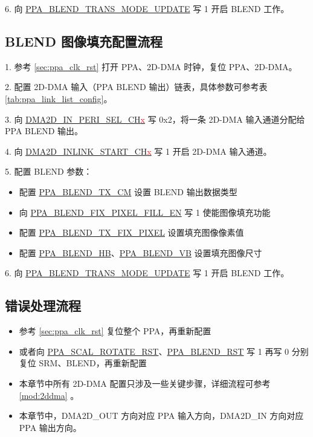 \documentclass[main\_\_CN.tex]{subfiles}
\begin{document}
6. 向 \hyperref[fielddesc:PPABLENDTRANSMODEUPDATE]{PPA\_BLEND\_TRANS\_MODE\_UPDATE} 写 1 开启 BLEND 工作。

\subsection{BLEND 图像填充配置流程}
1. 参考 \ref{sec:ppa_clk_rst} 打开 PPA、2D-DMA 时钟，复位 PPA、2D-DMA。

2. 配置 2D-DMA 输入（PPA BLEND 输出）链表，具体参数可参考表 \ref{tab:ppa_link_list_config}。

3. 向 \hyperref[fielddesc:DMA2DINPERISELCHN]{DMA2D\_IN\_PERI\_SEL\_CH\textcolor{red}{x}} 写 0x2，将一条 2D-DMA 输入通道分配给 PPA BLEND 输出。

4. 向 \hyperref[fielddesc:DMA2DINLINKSTARTCHN]{DMA2D\_INLINK\_START\_CH\textcolor{red}{x}} 写 1 开启 2D-DMA 输入通道。

5. 配置 BLEND 参数：
\begin{itemize}
    \item 配置 \hyperref[fielddesc:PPABLENDTXCM]{PPA\_BLEND\_TX\_CM} 设置 BLEND 输出数据类型
    \item 向 \hyperref[fielddesc:PPABLENDFIXPIXELFILLEN]{PPA\_BLEND\_FIX\_PIXEL\_FILL\_EN} 写 1 使能图像填充功能
    \item 配置 \hyperref[fielddesc:PPABLENDTXFIXPIXEL]{PPA\_BLEND\_TX\_FIX\_PIXEL} 设置填充图像像素值
    \item 配置 \hyperref[fielddesc:PPABLENDHB]{PPA\_BLEND\_HB}、\hyperref[fielddesc:PPABLENDVB]{PPA\_BLEND\_VB} 设置填充图像尺寸
\end{itemize}

6. 向 \hyperref[fielddesc:PPABLENDTRANSMODEUPDATE]{PPA\_BLEND\_TRANS\_MODE\_UPDATE} 写 1 开启 BLEND 工作。

\subsection{错误处理流程}
\begin{itemize}
    \item 参考 \ref{sec:ppa_clk_rst} 复位整个 PPA，再重新配置
    \item 或者向 \hyperref[fielddesc:PPASCALROTATERST]{PPA\_SCAL\_ROTATE\_RST}、\hyperref[fielddesc:PPABLENDRST]{PPA\_BLEND\_RST} 写 1 再写 0 分别复位 SRM、BLEND，再重新配置
\end{itemize}

\begin{tiplisting}
\begin{itemize}
    \vspace{-1.5em}
    \item 本章节中所有 2D-DMA 配置只涉及一些关键步骤，详细流程可参考 \ref{mod:2ddma} \textit{}。
    \item 本章节中，DMA2D\_OUT 方向对应 PPA 输入方向，DMA2D\_IN 方向对应 PPA 输出方向。
\end{itemize}
\end{tiplisting}
\end{document}
